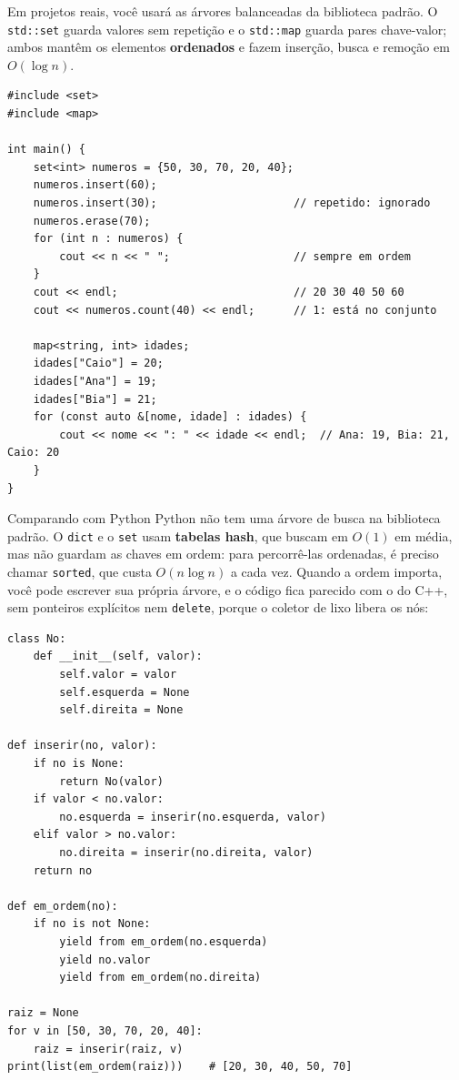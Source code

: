 Em projetos reais, você usará as árvores balanceadas da biblioteca padrão. O \texttt{std::set} guarda valores sem repetição e o \texttt{std::map} guarda pares chave-valor; ambos mantêm os elementos \textbf{ordenados} e fazem inserção, busca e remoção em $O(\log n)$.

\begin{codigo}
\begin{Verbatim}[breaklines=true, breaksymbolleft={}, fontsize=\footnotesize]
#include <set>
#include <map>

int main() {
    set<int> numeros = {50, 30, 70, 20, 40};
    numeros.insert(60);
    numeros.insert(30);                     // repetido: ignorado
    numeros.erase(70);
    for (int n : numeros) {
        cout << n << " ";                   // sempre em ordem
    }
    cout << endl;                           // 20 30 40 50 60
    cout << numeros.count(40) << endl;      // 1: está no conjunto

    map<string, int> idades;
    idades["Caio"] = 20;
    idades["Ana"] = 19;
    idades["Bia"] = 21;
    for (const auto &[nome, idade] : idades) {
        cout << nome << ": " << idade << endl;  // Ana: 19, Bia: 21, Caio: 20
    }
}
\end{Verbatim}
\end{codigo}

\begin{destaque}{Comparando com Python}
Python não tem uma árvore de busca na biblioteca padrão. O \texttt{dict} e o \texttt{set} usam \textbf{tabelas hash}, que buscam em $O(1)$ em média, mas não guardam as chaves em ordem: para percorrê-las ordenadas, é preciso chamar \texttt{sorted}, que custa $O(n \log n)$ a cada vez. Quando a ordem importa, você pode escrever sua própria árvore, e o código fica parecido com o do C++, sem ponteiros explícitos nem \texttt{delete}, porque o coletor de lixo libera os nós:

\begin{codigo}
\begin{Verbatim}[breaklines=true, breaksymbolleft={}, fontsize=\footnotesize]
class No:
    def __init__(self, valor):
        self.valor = valor
        self.esquerda = None
        self.direita = None

def inserir(no, valor):
    if no is None:
        return No(valor)
    if valor < no.valor:
        no.esquerda = inserir(no.esquerda, valor)
    elif valor > no.valor:
        no.direita = inserir(no.direita, valor)
    return no

def em_ordem(no):
    if no is not None:
        yield from em_ordem(no.esquerda)
        yield no.valor
        yield from em_ordem(no.direita)

raiz = None
for v in [50, 30, 70, 20, 40]:
    raiz = inserir(raiz, v)
print(list(em_ordem(raiz)))    # [20, 30, 40, 50, 70]
\end{Verbatim}
\end{codigo}
\end{destaque}

